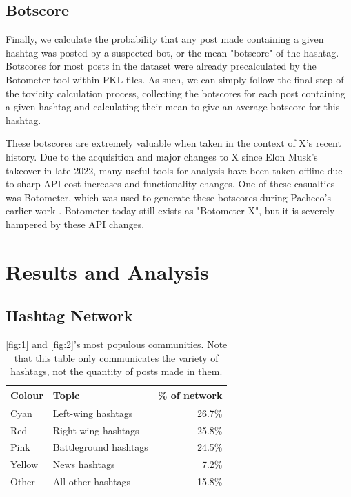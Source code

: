 \documentclass[a4paper,11pt]{article}  %
\begin{document}
	\subsection{Botscore}
	\label{subsec:botscore}
	Finally, we calculate the probability that any post made containing a given hashtag was posted by a suspected bot, or the mean "botscore" of the hashtag.
	Botscores for most posts in the dataset were already precalculated by the Botometer tool \parencite{sayyadiharikandehDetectionNovelSocial2020} within PKL files. As such, we can simply follow the final step of the toxicity calculation process, collecting the botscores for each post containing a given hashtag and calculating their mean to give an average botscore for this hashtag.

	These botscores are extremely valuable when taken in the context of X's recent history. Due to the acquisition and major changes to X since Elon Musk's takeover in late 2022, many useful tools for analysis have been taken offline due to sharp API cost increases and functionality changes. One of these casualties was Botometer, which was used to generate these botscores during Pacheco's earlier work \parencite{pachecoBotsElectionsControversies2023}. Botometer today still exists as "Botometer X", but it is severely hampered by these API changes.

	\section{Results and Analysis}
	\label{sec:results}
	\subsection{Hashtag Network}
	\label{subsec:network}

	\begin{table}[h!]%
		\centering
		\begin{tabular}{||l l r||} 
			\hline
			Colour & Topic & \% of network \\ [0.5ex] 
			\hline\hline
			Cyan & Left-wing hashtags & 26.7\% \\ 
			\hline
			Red & Right-wing hashtags & 25.8\% \\
			\hline
			Pink & Battleground hashtags & 24.5\% \\
			\hline
			Yellow & News hashtags & 7.2\% \\
			\hline
			Other & All other hashtags & 15.8\% \\
			\hline
		\end{tabular}
		\caption{\autoref{fig:1} and \autoref{fig:2}'s most populous communities. Note that this table only communicates the variety of hashtags, not the quantity of posts made in them.}
		\label{tab:1}
	\end{table}
\end{document}
